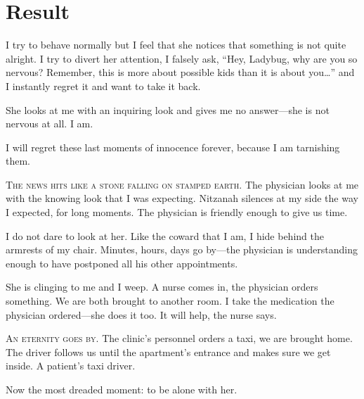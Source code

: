 \chapter*{Result}\label{result}

I try to behave normally but I feel that she notices that something is not quite alright. I try to divert her attention, I falsely ask, \enquote{Hey, Ladybug, why are you so nervous? Remember, this is more about possible kids than it is about you\dots{}} and I instantly regret it and want to take it back.

She looks at me with an inquiring look and gives me no answer---she is not nervous at all. I am.

I will regret these last moments of innocence forever, because I am tarnishing them. 

\bigskip\noindent\textsc{The news hits like a stone falling on stamped earth.} The physician looks at me with the knowing look that I was expecting. Nitzanah silences at my side the way I expected, for long moments. The physician is friendly enough to give us time. 

I do not dare to look at her. Like the coward that I am, I hide behind the armrests of my chair. Minutes, hours, days go by---the physician is understanding enough to have postponed all his other appointments.

She is clinging to me and I weep. A nurse comes in, the physician orders something. We are both brought to another room. I take the medication the physician ordered---she does it too. It will help, the nurse says. 

\bigskip\noindent\textsc{An eternity goes by.} The clinic's personnel orders a taxi, we are brought home. The driver follows us until the apartment's entrance and makes sure we get inside. A patient's taxi driver.

Now the most dreaded moment: to be alone with her.